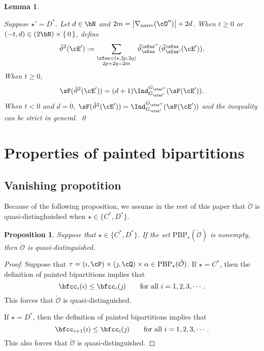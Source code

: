 \documentclass[12pt,a4paper]{amsart}
\def\abs#1{\left|{#1}\right|}
\newcommand{\CO}{{\mathcal {O}}}
\def\DD{\nabla}
\numberwithin{equation}{section}
\newtheorem{lem}[thm]{Lemma}
\newtheorem{prop}[thm]{Proposition}
\theoremstyle{remark}
\def\DDn{\DD_{\mathrm{naive}}}
\def\cOpp{\cO^{\prime\prime}}
\begin{document}
\begin{lem}
\begin{enuma}
 \item Suppose $\star' = D^*$. 
    Let $d\in \bN$ and $2m = \abs{\DDn(\cOpp)}+2d$.
    When $t\geq 0$ or $(-t,d) \in (2\bN)\times \set{0}$, define
 \[
   \dblift(\cE') := 
   \sum_{\substack{\sfss = (\star,2p,2q)\\ 2p+2q=2m}}
   \dlift_{\sfss}^{\sfss''}(\dlift_{\sfss'}^{\sfss}(\cE')).
   \]    
  When $t\geq 0$,   
  \[
    \sF(\dblift(\cE')) = (d+1) \indsss(\sF(\cE')). 
  \]
  When $t< 0$ and $d=0$,  $\sF(\dblift(\cE')) = \indsss(\sF(\cE'))$ 
  and the inequality can be strict in general. \qed
  \end{enuma}
\end{lem}



\section{Properties of painted bipartitions}
\def\ckfgg{{\check \fgg}}
\def\pcT{\cT^+}
\def\ncT{\cT^-}


\subsection{Vanishing propotition}
Because of the following proposition, we assume in the rest of this paper that $\check \CO$ is quasi-distinghuished  when $\star\in \{C^*, D^*\}$.


\begin{prop}
  Suppose that $\star\in \{C^*, D^*\}$. If the set $\mathrm{PBP}_\star(\check \CO)$ is nonempty, then $\check \CO$ is quasi-distinguished.
\end{prop}
\begin{proof}
  Suppose that $\tau=(\imath,\cP)\times(\jmath,\cQ)\times \alpha \in  \mathrm{PBP}_\star(\check \CO)$. If  $\star=C^*$, then  the definition of painted bipartitions implies that
 \[
 \bfcc_i(\imath)\leq \bfcc_i(\jmath) \qquad \textrm{for all } i=1,2,3, \cdots.
 \]
This forces that $\check \CO$ is quasi-distinguished.

 If  $\star=D^*$, then  the definition of painted bipartitions implies that
 \[
 \bfcc_{i+1}(\imath)\leq \bfcc_i(\jmath) \qquad \textrm{for all } i=1,2,3, \cdots.
 \]
This  also forces that   $\check \CO$ is quasi-distinguished.
 \end{proof}
\end{document}
